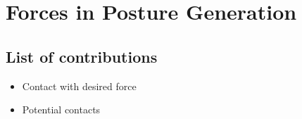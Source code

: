 \chapter{
  Forces in Posture Generation
}

\section{List of contributions}
\begin{itemize}
  \item{Contact with desired force}
  \item{Potential contacts}
\end{itemize}
